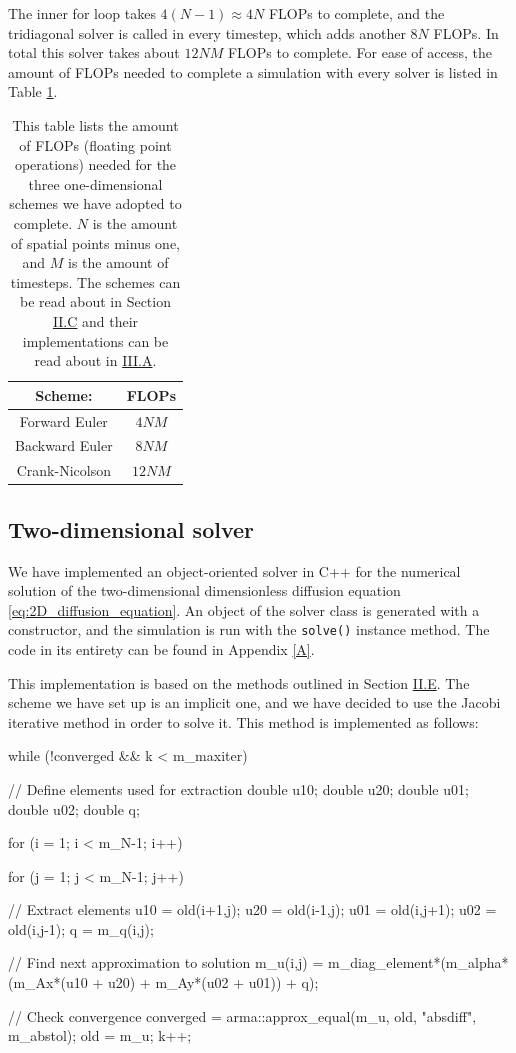 \documentclass[reprint,english,notitlepage]{revtex4-1}  %
\begin{document}
The inner for loop takes $4(N-1) \approx 4N$ FLOPs to complete, and the tridiagonal solver is called in every timestep, which adds another $8N$ FLOPs. In total this solver takes about $12NM$ FLOPs to complete. For ease of access, the amount of FLOPs needed to complete a simulation with every solver is listed in Table \ref{table:FLOPs_1D}.

\begin{table}[H]
\centering
\caption{This table lists the amount of FLOPs (floating point operations) needed for the three one-dimensional schemes we have adopted to complete. $N$ is the amount of spatial points minus one, and $M$ is the amount of timesteps. The schemes can be read about in Section \hyperref[sec:formalism_numerical_1D]{II.C} and their implementations can be read about in \hyperref[sec:method_1D_solver]{III.A}.} \label{table:FLOPs_1D}
\begin{tabular}{|c|c|}
\hline 
Scheme: & FLOPs \\
\hline
Forward Euler & $4NM$ \\
\hline
Backward Euler & $8NM$ \\
\hline
Crank-Nicolson & $12NM$ \\
\hline
\end{tabular}
\end{table}

\subsection{Two-dimensional solver} \label{sec:method_2D_solver}

We have implemented an object-oriented solver in C++ for the numerical solution of the two-dimensional dimensionless diffusion equation \eqref{eq:2D_diffusion_equation}. An object of the solver class is generated with a constructor, and the simulation is run with the \verb+solve()+ instance method. The code in its entirety can be found in Appendix \ref{A}. 

This implementation is based on the methods outlined in Section \hyperref[sec:formalism_2D_diff_eq_numerical]{II.E}. The scheme we have set up is an implicit one, and we have decided to use the Jacobi iterative method in order to solve it. This method is implemented as follows:

\begin{cpp}
while (!converged && k < m_maxiter){
  // Define elements used for extraction
  double u10;
  double u20;
  double u01;
  double u02;
  double q;

  for (i = 1; i < m_N-1; i++){
    for (j = 1; j < m_N-1; j++){
      // Extract elements
      u10 = old(i+1,j);
      u20 = old(i-1,j);
      u01 = old(i,j+1);
      u02 = old(i,j-1);
      q = m_q(i,j);

      // Find next approximation to solution
      m_u(i,j) = m_diag_element*(m_alpha*(m_Ax*(u10 + u20)
      		   + m_Ay*(u02 + u01)) + q);
    }
  }
  // Check convergence
  converged = arma::approx_equal(m_u, old, "absdiff", m_abstol);
  old = m_u;
  k++;
}
\end{cpp}
\end{document}
